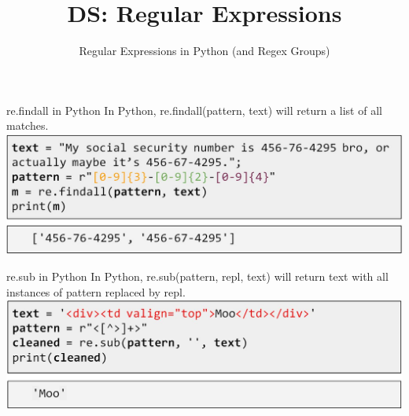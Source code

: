 \documentclass[aspectratio=169]{../latex_main/tntbeamer}  %
\title[Introduction]{DS: Regular Expressions}
\subtitle{Regular Expressions in Python (and Regex Groups)}
\begin{document}
	
	\maketitle
	\begin{frame}{re.findall in Python}
	    In Python, re.findall(pattern, text) will return a list of all matches.
	    \includegraphics[scale=.35]{Bild19}
	\end{frame}
	
	
	\begin{frame}{re.sub in Python}
    	In Python, re.sub(pattern, repl, text) will return text with all instances of pattern replaced by repl.
	    \includegraphics[scale=.35]{Bild20}
	\end{frame}
	
\end{document}
